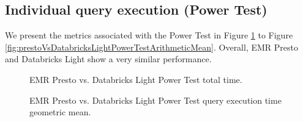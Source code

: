 \subsection{Individual query execution (Power Test)}

We present the metrics associated with the Power Test in Figure \ref{fig:prestoVsDatabricksLightPowerTestTotalTime} to Figure \ref{fig:prestoVsDatabricksLightPowerTestArithmeticMean}. Overall, EMR Presto and Databricks Light show a very similar performance.

\begin{figure}
   \begin{center}
   \end{center}
   \caption{EMR Presto vs. Databricks Light Power Test total time.}
   \label{fig:prestoVsDatabricksLightPowerTestTotalTime}
\end{figure}

\begin{figure}
   \begin{center}
   \end{center}
   \caption{EMR Presto vs. Databricks Light Power Test query execution time geometric mean.}
   \label{fig:prestoVsDatabricksLightPowerTestGeomean}
\end{figure}

